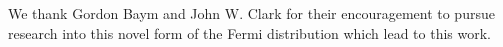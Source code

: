 \documentclass[sn-mathphys,Numbered]{sn-jnl}
\begin{document}

\backmatter

We thank Gordon Baym and John W. Clark for their encouragement to pursue research into this novel form of the Fermi distribution which lead to this work.


\end{document}
